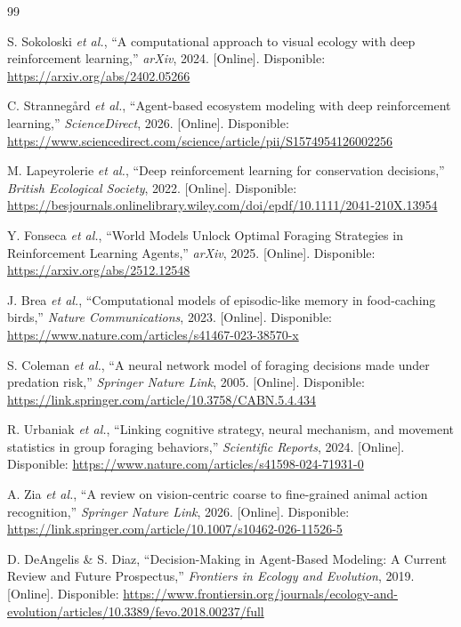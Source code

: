 \documentclass[conference]{IEEEtran}
\begin{document}
\begin{thebibliography}{99}

S. Sokoloski \textit{et al.}, ``A computational approach to visual ecology with deep reinforcement learning,'' \textit{arXiv}, 2024. [Online]. Disponible: \url{https://arxiv.org/abs/2402.05266}

C. Strannegård \textit{et al.}, ``Agent-based ecosystem modeling with deep reinforcement learning,'' \textit{ScienceDirect}, 2026. [Online]. Disponible: \url{https://www.sciencedirect.com/science/article/pii/S1574954126002256}

M. Lapeyrolerie \textit{et al.}, ``Deep reinforcement learning for conservation decisions,'' \textit{British Ecological Society}, 2022. [Online]. Disponible: \url{https://besjournals.onlinelibrary.wiley.com/doi/epdf/10.1111/2041-210X.13954}

Y. Fonseca \textit{et al.}, ``World Models Unlock Optimal Foraging Strategies in Reinforcement Learning Agents,'' \textit{arXiv}, 2025. [Online]. Disponible: \url{https://arxiv.org/abs/2512.12548}

J. Brea \textit{et al.}, ``Computational models of episodic-like memory in food-caching birds,'' \textit{Nature Communications}, 2023. [Online]. Disponible: \url{https://www.nature.com/articles/s41467-023-38570-x}

S. Coleman \textit{et al.}, ``A neural network model of foraging decisions made under predation risk,'' \textit{Springer Nature Link}, 2005. [Online]. Disponible: \url{https://link.springer.com/article/10.3758/CABN.5.4.434}

R. Urbaniak \textit{et al.}, ``Linking cognitive strategy, neural mechanism, and movement statistics in group foraging behaviors,'' \textit{Scientific Reports}, 2024. [Online]. Disponible: \url{https://www.nature.com/articles/s41598-024-71931-0}

A. Zia \textit{et al.}, ``A review on vision-centric coarse to fine-grained animal action recognition,'' \textit{Springer Nature Link}, 2026. [Online]. Disponible: \url{https://link.springer.com/article/10.1007/s10462-026-11526-5}

D. DeAngelis \& S. Diaz, ``Decision-Making in Agent-Based Modeling: A Current Review and Future Prospectus,'' \textit{Frontiers in Ecology and Evolution}, 2019. [Online]. Disponible: \url{https://www.frontiersin.org/journals/ecology-and-evolution/articles/10.3389/fevo.2018.00237/full}


\end{thebibliography}
\end{document}
